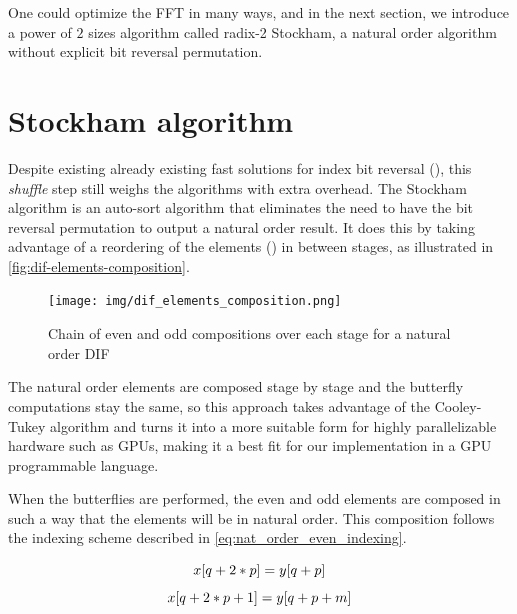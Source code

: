\documentclass[
  oneside,
  11pt, a4paper,
  footinclude=true,
  headinclude=true,
  cleardoublepage=empty
]{scrbook}
\begin{document}
One could optimize the FFT in many ways, and in the next section, we introduce a power of $2$ sizes algorithm called radix-2 Stockham, a natural order algorithm without explicit bit reversal permutation.


\section{Stockham algorithm} \label{sec:stockham-algorithm}


Despite existing already existing fast solutions for index bit reversal (\cite{prado2004new}), this \textit{shuffle} step still weighs the algorithms with extra overhead. The Stockham algorithm is an auto-sort algorithm that eliminates the need to have the bit reversal permutation to output a natural order result. It does this by taking advantage of a reordering of the elements (\cite{govindaraju2008high}) in between stages, as illustrated in \autoref{fig:dif-elements-composition}.

\begin{figure}[h] 
    \centering
    \texttt{[image: img/dif\_elements\_composition.png]}
    \caption{Chain of even and odd compositions over each stage for a natural order DIF}
    \label{fig:dif-elements-composition}
\end{figure}

The natural order elements are composed stage by stage and the butterfly computations stay the same, so this approach takes advantage of the Cooley-Tukey algorithm and turns it into a more suitable form for highly parallelizable hardware such as GPUs, making it a best fit for our implementation in a GPU programmable language. \newline

When the butterflies are performed, the even and odd elements are composed in such a way that the elements will be in natural order. This composition follows the indexing scheme described in \autoref{eq:nat_order_even_indexing}.

\begin{equation} \label{eq:nat_order_even_indexing}
    x[q + 2*p] = y[q + p] \\
\end{equation}
\begin{equation} \label{eq:nat_order_odd_indexing}
    x[q + 2*p + 1] = y[q + p + m] \\
\end{equation}
\end{document}
